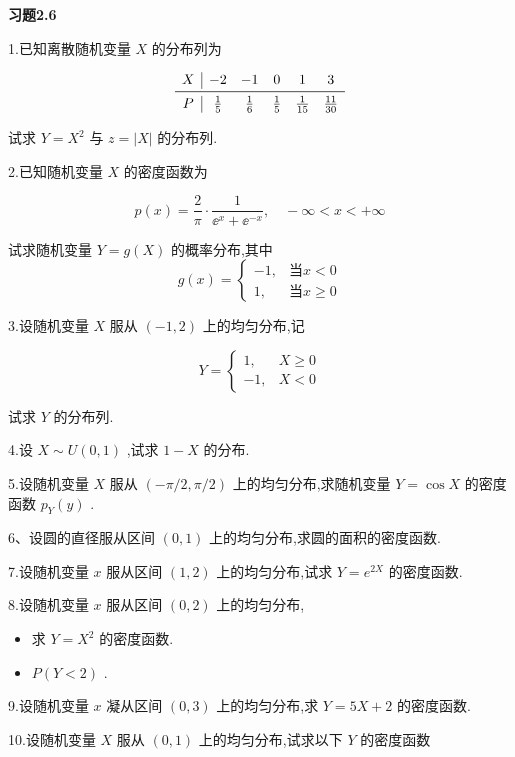 \begin{center}
	\textbf{习题2.6}
\end{center}

1.已知离散随机变量 $ X $ 的分布列为

\[
\begin{array}{c|ccccc}
X & {-2} & {-1} & {0} & {1} & {3} \\ \midrule 
P & {\frac{1}{5}} & {\frac{1}{6}} & {\frac{1}{5}} & {\frac{1}{15}} & {\frac{11}{30}}
\end{array}
\]

试求 $ Y=X^{2} $ 与 $ z=|X| $ 的分布列.

2.已知随机变量 $ X $ 的密度函数为

\[
p(x)=\frac{2}{\pi} \cdot \frac{1}{\ee ^{x}+\ee ^{-x}}, \quad-\infty<x<+\infty
\]

试求随机变量 $ Y=g(X) $ 的概率分布,其中
\[
g(x)=\left\{
\begin{array}{ll}
{-1,} & {\text{当} x<0}\\ 
{1,} & {\text{当} x \geqslant 0}
\end{array}\right.
\]

3.设随机变量 $ X $ 服从 $ (-1,2) $ 上的均匀分布,记

\[
Y=\left\{\begin{array}{ll}{1,} & {X \geqslant 0} \\ {-1,} & {X<0}\end{array}\right.
\]

试求 $ Y $ 的分布列.

4.设 $ X \sim U(0,1) $ ,试求 $ 1-X $ 的分布.

5.设随机变量 $ X $ 服从 $ (-\pi / 2, \pi / 2) $ 上的均匀分布,求随机变量 $ Y=\cos X $ 的密度函数 $ p_{Y}(y) $ .

6、设圆的直径服从区间 $ (0,1) $ 上的均匀分布,求圆的面积的密度函数.

7.设随机变量 $ x $ 服从区间 $ (1,2) $ 上的均匀分布,试求 $ Y=e^{2 X} $ 的密度函数.

8.设随机变量 $ x $ 服从区间 $ (0,2) $ 上的均匀分布,

\begin{itemize}
	\item 求 $ Y=X^{2} $ 的密度函数.
	\item $ P(Y<2) $ .
\end{itemize}

9.设随机变量 $ x $ 凝从区间 $ (0,3) $ 上的均匀分布,求 $ Y=5X+2 $ 的密度函数.

10.设随机变量 $ X $ 服从 $ (0,1) $ 上的均匀分布,试求以下 $ Y $ 的密度函数

